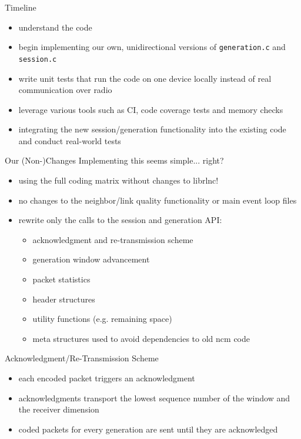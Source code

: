 \documentclass[11pt]{beamer}
\begin{document}
	\begin{frame}{Timeline}
		\begin{itemize}
			\item understand the code
			\item begin implementing our own, unidirectional versions of \texttt{generation.c} and \texttt{session.c}
			\item write unit tests that run the code on one device locally instead of real communication over radio
			\item leverage various tools such as CI, code coverage tests and memory checks
			\item integrating the new session/generation functionality into the existing code and conduct real-world tests
		\end{itemize}
	\end{frame}

	\begin{frame}{Our (Non-)Changes}
		Implementing this seems simple... right?
		\begin{itemize}
			\item using the full coding matrix without changes to librlnc!
			\item no changes to the neighbor/link quality functionality or main event loop files
			\item rewrite only the calls to the session and generation API:
			\begin{itemize}
				\item acknowledgment and re-transmission scheme
				\item generation window advancement
				\item packet statistics
				\item header structures
				\item utility functions (e.g. remaining space)
				\item meta structures used to avoid dependencies to old ncm code
			\end{itemize}
		\end{itemize}
	\end{frame}

	\begin{frame}{Acknowledgment/Re-Transmission Scheme}
		\begin{itemize}
			\item each encoded packet triggers an acknowledgment
			\item acknowledgments transport the lowest sequence number of the window and the receiver dimension
			\item coded packets for every generation are sent until they are acknowledged
		\end{itemize}
	\end{frame}
\end{document}
